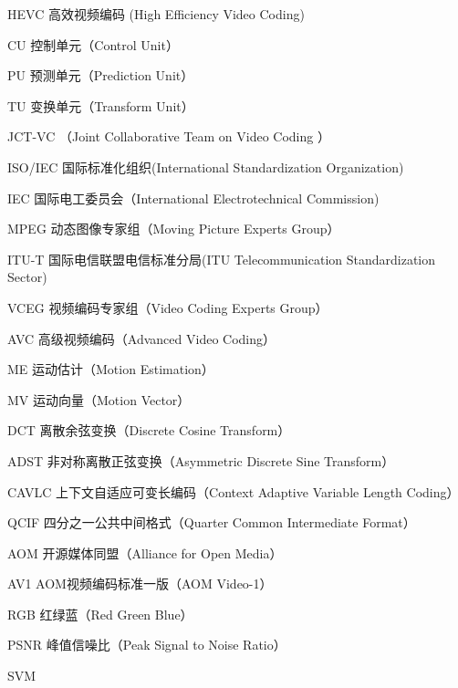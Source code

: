 \begin{denotation}[3cm]
\item[HEVC] 高效视频编码 (High Efficiency Video Coding)
\item[CU] 控制单元（Control Unit）
\item[PU] 预测单元（Prediction Unit）
\item[TU] 变换单元（Transform Unit）
\item[JCT-VC] （Joint Collaborative Team on Video Coding ）
\item[ISO/IEC] 国际标准化组织(International Standardization Organization)
\item[IEC] 国际电工委员会（International Electrotechnical Commission)
\item[MPEG] 动态图像专家组（Moving Picture Experts Group）
\item[ITU-T] 国际电信联盟电信标准分局(ITU Telecommunication Standardization Sector)
\item[VCEG] 视频编码专家组（Video Coding Experts Group）
\item[AVC] 高级视频编码（Advanced Video Coding）
\item[ME] 运动估计（Motion Estimation）
\item[MV] 运动向量（Motion Vector）
\item[DCT] 离散余弦变换（Discrete Cosine Transform）
\item[ADST] 非对称离散正弦变换（Asymmetric Discrete Sine Transform）
\item[CAVLC] 上下文自适应可变长编码（Context Adaptive Variable Length Coding）
\item[QCIF] 四分之一公共中间格式（Quarter Common Intermediate Format）
\item[AOM] 开源媒体同盟（Alliance for Open Media）
\item[AV1] AOM视频编码标准一版（AOM Video-1）
\item[RGB] 红绿蓝（Red Green Blue）
\item[PSNR] 峰值信噪比（Peak Signal to Noise Ratio）
\item[SVM]
\end{denotation}
